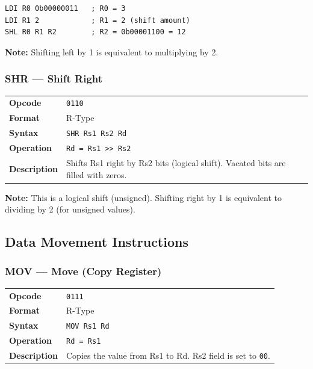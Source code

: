 \documentclass[11pt,a4paper]{article}
\newcommand{\opcode}[1]{\texttt{#1}}
\begin{document}
\begin{lstlisting}
LDI R0 0b00000011   ; R0 = 3
LDI R1 2            ; R1 = 2 (shift amount)
SHL R0 R1 R2        ; R2 = 0b00001100 = 12
\end{lstlisting}

\textbf{Note:} Shifting left by 1 is equivalent to multiplying by 2.

\subsubsection{SHR --- Shift Right}

\begin{table}[H]
\begin{tabularx}{\textwidth}{@{}lX@{}}
\toprule
\textbf{Opcode}      & \opcode{0110} \\
\textbf{Format}      & R-Type \\
\textbf{Syntax}      & \lstinline|SHR Rs1 Rs2 Rd| \\
\textbf{Operation}   & \texttt{Rd = Rs1 >{}> Rs2} \\
\textbf{Description} & Shifts Rs1 right by Rs2 bits (logical shift). Vacated bits are filled with zeros. \\
\bottomrule
\end{tabularx}
\end{table}

\textbf{Note:} This is a logical shift (unsigned). Shifting right by 1 is equivalent to dividing by 2 (for unsigned values).

\subsection{Data Movement Instructions}

\subsubsection{MOV --- Move (Copy Register)}

\begin{table}[H]
\begin{tabularx}{\textwidth}{@{}lX@{}}
\toprule
\textbf{Opcode}      & \opcode{0111} \\
\textbf{Format}      & R-Type \\
\textbf{Syntax}      & \lstinline|MOV Rs1 Rd| \\
\textbf{Operation}   & \texttt{Rd = Rs1} \\
\textbf{Description} & Copies the value from Rs1 to Rd. Rs2 field is set to \texttt{00}. \\
\bottomrule
\end{tabularx}
\end{table}
\end{document}

